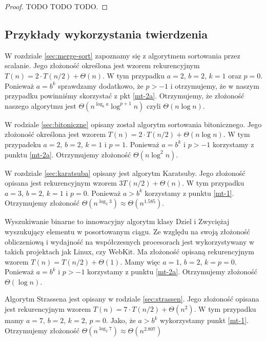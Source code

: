 \begin{proof}
 TODO TODO TODO.
\end{proof}

\subsection{Przykłady wykorzystania twierdzenia}

W rozdziale \ref{sec:merge-sort} zapoznamy się z algorytmem sortowania przez scalanie.
Jego złożoność określona jest wzorem rekurencyjnym $T(n) = 2 \cdot T(n/2) + \Theta(n)$.
W tym przypadku $a = 2$, $b = 2$, $k = 1$ oraz $p = 0$.
Ponieważ $a = b^k$ sprawdzamy dodatkowo, że $p > -1$ i otrzymujemy, że w naszym przypadku powinniśmy skorzystać z pkt \ref{mt-2a}.
Otrzymujemy, że złożoność naszego algorytmu jest $\Theta(n^{\log_b a} \log^{p + 1} n)$ czyli $\Theta(n\log n)$.

W rodziale \ref{sec:bitoniczne} opisany został algorytm sortowania bitonicznego.
Jego złożoność określona jest wzorem $T(n) = 2 \cdot T(n/2) + \Theta(n \log n)$.
W tym przypadeku $a = 2$, $b = 2$, $k=1$ i $p = 1$.
Ponieważ $a = b^k$ i $p > -1$ korzystamy z punktu \ref{mt-2a}.
Otrzymujemy złożoność $\Theta(n \log^2 n)$.

W rozdziale \ref{sec:karatsuba} opisany jest algorytm Karatsuby. Jego złożoność opisana jest rekurencyjnym wzorem $3 T(n/2) + \Theta(n)$.
W tym przypadku $a = 3$, $b = 2$, $k=1$ i $p=0$.
Ponieważ $a > b^k$ korzystamy z punktu \ref{mt-1}.
Otrzymujemy złożoność $\Theta(n^{\log_{2} 3}) \approx \Theta(n^{1.585}).$

Wyszukiwanie binarne to innowacyjny algorytm klasy Dziel i Zwyciężaj wyszukujący elementu w posortowanym ciągu.
Ze względu na swoją złożoność obliczeniową i wydajność na współczesnych procesorach jest wykorzystywany w takich projektach jak Linux, czy WebKit.
Ma złożoność opisaną rekurencyjnym wzorem $T(n) = T(n/2) + \Theta(1)$.
Mamy więc $a = 1$, $b = 2$, $k = p = 0$.
Ponieważ $a = b^k$ i $p > -1$ korzystamy z punktu \ref{mt-2a}.
Otrzymujemy złożoność $\Theta(\log n)$.

Algorytm Strassena jest opisany w rodziale \ref{sec:strassen}.
Jego złożoność opisana jest rekurencyjnym wzorem $T(n) = 7 \cdot T(n/2) + \Theta(n^2)$.
W tym przypadku mamy $a = 7$, $b = 2$, $k = 2$, $p = 0$.
Jako, że $a > b^k$ wykorzystamy punkt \ref{mt-1}.
Otrzymujemy złożoność $\Theta(n^{\log_{2} 7}) \approx \Theta(n^{2.807})$

